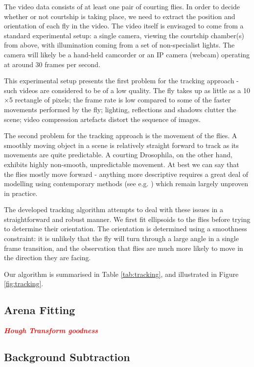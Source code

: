 \documentclass[twocolumn]{article}
\newcommand{\todo}[1]{\textsf{\emph{\textbf{\textcolor{red}{#1}}}}}
\begin{document}
The video data consists of at least one pair of courting flies. In order to decide whether or not courtship is taking place, we need to extract the position and orientation of each fly in the video. The video itself is envisaged to come from a standard experimental setup: a single camera, viewing the courtship chamber(s) from above, with illumination coming from a set of non-specialist lights. The camera will likely be a hand-held camcorder or an IP camera (webcam) operating at around 30 frames per second. 

This experimental setup presents the first problem for the tracking approach - such videos are considered to be of a low quality. The fly takes up as little as a 10$\times$5 rectangle of pixels; the frame rate is low compared to some of the faster movements performed by the fly; lighting, reflections and shadows clutter the scene; video compression artefacts distort the sequence of images. 

The second problem for the tracking approach is the movement of the flies. A smoothly moving object in a scene is relatively straight forward to track as its movements are quite predictable. A courting Drosophila, on the other hand, exhibits highly non-smooth, unpredictable movement. At best we can say that the flies mostly move forward - anything more descriptive requires a great deal of modelling using contemporary methods (see e.g. \cite{Oh}) which remain largely unproven in practice.

The developed tracking algorithm attempts to deal with these issues in a straightforward and robust manner. We first fit ellipsoids to the flies before trying to determine their orientation. The orientation is determined using a smoothness constraint: it is unlikely that the fly will turn through a large angle in a single frame transition, and the observation that flies are much more likely to move in the direction they are facing.

Our algorithm is summarised in Table \ref{tab:tracking}, and illustrated in Figure \ref{fig:tracking}.

\subsection{Arena Fitting}

\todo{Hough Transform goodness}

\subsection{Background Subtraction}
\end{document}
